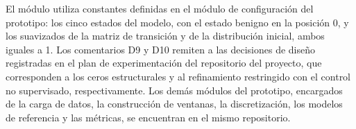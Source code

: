 El módulo utiliza constantes definidas en el módulo de configuración del prototipo: los cinco estados del modelo, con el estado benigno en la posición 0, y los suavizados de la matriz de transición y de la distribución inicial, ambos iguales a 1. Los comentarios D9 y D10 remiten a las decisiones de diseño registradas en el plan de experimentación del repositorio del proyecto, que corresponden a los ceros estructurales y al refinamiento restringido con el control no supervisado, respectivamente. Los demás módulos del prototipo, encargados de la carga de datos, la construcción de ventanas, la discretización, los modelos de referencia y las métricas, se encuentran en el mismo repositorio.


